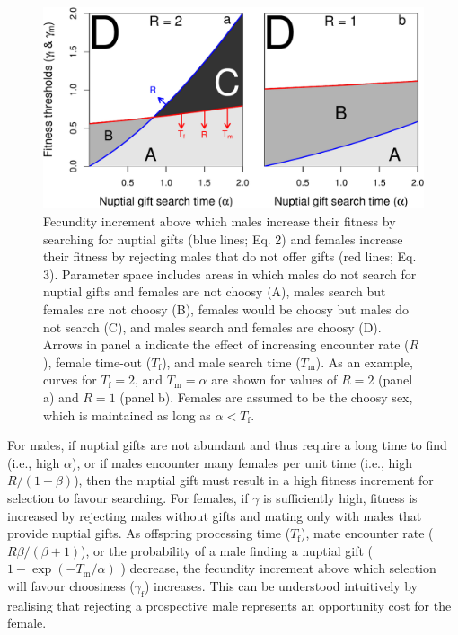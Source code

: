 \documentclass[
]{article}
\begin{document}
\begin{figure}
\centering
\includegraphics{index_files/figure-latex/unnamed-chunk-3-1.pdf}
\caption{Fecundity increment above which males increase their fitness by
searching for nuptial gifts (blue lines; Eq. 2) and females increase
their fitness by rejecting males that do not offer gifts (red lines; Eq.
3). Parameter space includes areas in which males do not search for
nuptial gifts and females are not choosy (A), males search but females
are not choosy (B), females would be choosy but males do not search (C),
and males search and females are choosy (D). Arrows in panel a indicate
the effect of increasing encounter rate (\(R\)), female time-out
(\(T_{\mathrm{f}}\)), and male search time (\(T_{\mathrm{m}}\)). As an
example, curves for \(T_{\mathrm{f}} = 2\), and
\(T_{\mathrm{m}} = \alpha\) are shown for values of \(R=2\) (panel a)
and \(R = 1\) (panel b). Females are assumed to be the choosy sex, which
is maintained as long as \(\alpha < T_{\mathrm{f}}\).}
\end{figure}

For males, if nuptial gifts are not abundant and thus require a long
time to find (i.e., high \(\alpha\)), or if males encounter many females
per unit time (i.e., high \(R / (1+\beta)\)), then the nuptial gift must
result in a high fitness increment for selection to favour searching.
For females, if \(\gamma\) is sufficiently high, fitness is increased by
rejecting males without gifts and mating only with males that provide
nuptial gifts. As offspring processing time (\(T_{\mathrm{f}}\)), mate
encounter rate (\(R\beta / (\beta + 1)\)), or the probability of a male
finding a nuptial gift (\(1 - \exp(-T_{\mathrm{m}}/\alpha)\) ) decrease,
the fecundity increment above which selection will favour choosiness
(\(\gamma_{\mathrm{f}}\)) increases. This can be understood intuitively
by realising that rejecting a prospective male represents an opportunity
cost for the female.
\end{document}
